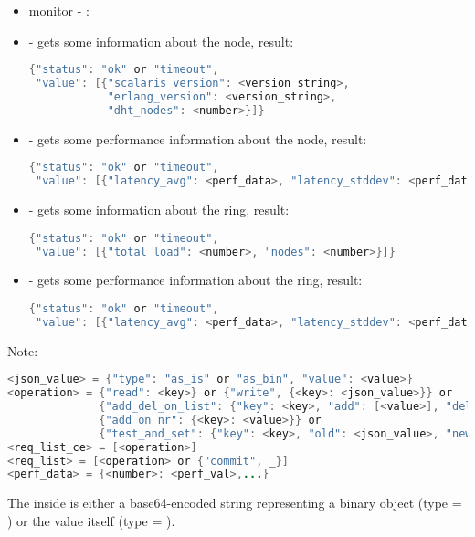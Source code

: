 \begin{itemize}
  \item[] \hspace{-1.7em}monitor - :
  \item {} - gets some information about the node, result:
\begin{lstlisting}[language=java]
{"status": "ok" or "timeout",
 "value": [{"scalaris_version": <version_string>,
            "erlang_version": <version_string>,
            "dht_nodes": <number>}]}
\end{lstlisting}
  \item {} - gets some performance information about the node, result:
\begin{lstlisting}[language=java]
{"status": "ok" or "timeout",
 "value": [{"latency_avg": <perf_data>, "latency_stddev": <perf_data>}]}
\end{lstlisting}
  \item {} - gets some information about the \scalaris{} ring, result:
\begin{lstlisting}[language=java]
{"status": "ok" or "timeout",
 "value": [{"total_load": <number>, "nodes": <number>}]}
\end{lstlisting}
  \item {} - gets some performance information about the \scalaris{} ring, result:
\begin{lstlisting}[language=java]
{"status": "ok" or "timeout",
 "value": [{"latency_avg": <perf_data>, "latency_stddev": <perf_data>}]}
\end{lstlisting}
\end{itemize}

Note:
\begin{lstlisting}[language=java]
<json_value> = {"type": "as_is" or "as_bin", "value": <value>}
<operation> = {"read": <key>} or {"write", {<key>: <json_value>}} or
              {"add_del_on_list": {"key": <key>, "add": [<value>], "del": [<value>]}} or
              {"add_on_nr": {<key>: <value>}} or
              {"test_and_set": {"key": <key>, "old": <json_value>, "new": <json_value>}}
<req_list_ce> = [<operation>]
<req_list> = [<operation> or {"commit", _}]
<perf_data> = {<number>: <perf_val>,...}
\end{lstlisting}
The  inside  is either a base64-encoded
string representing a binary object (type = ) or the value
itself (type = ).

